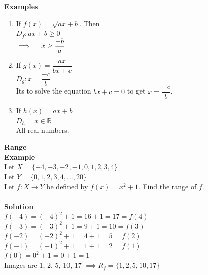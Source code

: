 \documentclass[11pt,a4paper]{article}
\begin{document}
\textbf{Examples}
\begin{enumerate}
\item If $f(x)=\sqrt{ax+b}$. Then\\

$D_f: ax+b\geq 0$\\

$\implies \hspace{0.4cm} x\geq \dfrac{-b}{a}$\\

\item If $g(x)=\dfrac{ax}{bx+c}$\\

$D_g: x=\dfrac{-c}{b}$\\

Its to solve the equation $bx+c=0$ to get $x=\dfrac{-c}{b}$.\\

\item If $h(x)=ax+b$\\

$D_h=x\in \mathbb{R}$\\
All real numbers.\\
\end{enumerate}



\textbf{Range}\\

\textbf{Example}\\
Let $X=\{-4,-3,-2,-1,0,1,2,3,4\}$\\

Let $Y=\{0,1,2,3,4,\ldots, 20\}$\\

Let $f:X\longrightarrow Y$ be defined by $f(x)=x^2+1$. Find the range of $f$.\\\\

\textbf{Solution}\\
$f(-4)=(-4)^2+1=16+1=17=f(4)$\\

$f(-3)=(-3)^2+1=9+1=10=f(3)$\\

$f(-2)=(-2)^2+1=4+1=5=f(2)$\\

$f(-1)=(-1)^2+1=1+1=2=f(1)$\\

$f(0)=0^2+1=0+1=1$\\


Images are 1, 2, 5, 10, 17 $\implies R_f=\{1,2,5,10,17\}$\\\\
\end{document}
